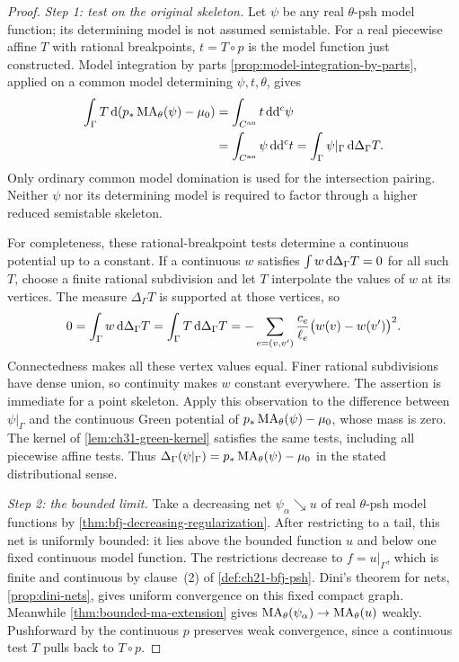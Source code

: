 \begin{proof}
\emph{Step 1: test on the original skeleton.}
Let \(\psi\) be any real \(\theta\)-psh model function; its determining
model is not assumed semistable.  For a real piecewise affine \(T\)
with rational breakpoints, \(t=T\circ p\) is the model function just
constructed.  Model integration by parts
\cref{prop:model-integration-by-parts}, applied on a common model
determining \(\psi,t,\theta\), gives
\begin{equation}
\label{eq:ch25-weighted-skeletal-test}
 \begin{aligned}
 \int_\Gamma T\,\mathrm d(p_*\operatorname{MA}_\theta(\psi)-\mu_0)
 &=\int_{C^{\mathrm{an}}}t\,\mathrm d\mathrm d^c\psi\\
 &=\int_{C^{\mathrm{an}}}\psi\,\mathrm d\mathrm d^c t
 =\int_\Gamma\psi|_\Gamma\,\mathrm d\Delta_\Gamma T.
 \end{aligned}
\end{equation}
Only ordinary common model domination is used for the intersection
pairing.  Neither \(\psi\) nor its determining model is required to
factor through a higher reduced semistable skeleton.

For completeness, these rational-breakpoint tests determine a
continuous potential up to a constant.  If a continuous \(w\) satisfies
\(\int w\,\mathrm d\Delta_\Gamma T=0\) for all such \(T\), choose a finite
rational subdivision and let \(T\) interpolate the values of \(w\) at
its vertices.  The measure \(\Delta_\Gamma T\) is supported at those
vertices, so
\[
 0=\int_\Gamma w\,\mathrm d\Delta_\Gamma T
   =\int_\Gamma T\,\mathrm d\Delta_\Gamma T
   =-\sum_{e=(v,v')}\frac{c_e}{\ell_e}
                         \bigl(w(v)-w(v')\bigr)^2.
\]
Connectedness makes all these vertex values equal.  Finer rational
subdivisions have dense union, so continuity makes \(w\) constant
everywhere.  The assertion is immediate for a point skeleton.
Apply this observation to the difference between \(\psi|_\Gamma\)
and the continuous Green potential of
\(p_*\operatorname{MA}_\theta(\psi)-\mu_0\), whose mass is zero.  The kernel of
\cref{lem:ch31-green-kernel} satisfies the same tests, including all
piecewise affine tests.  Thus
\(\Delta_\Gamma(\psi|_\Gamma)=p_*\operatorname{MA}_\theta(\psi)-\mu_0\) in the
stated distributional sense.

\emph{Step 2: the bounded limit.}
Take a decreasing net \(\psi_\alpha\searrow u\) of real
\(\theta\)-psh model functions by
\cref{thm:bfj-decreasing-regularization}.  After restricting to a
tail, this net is uniformly bounded: it lies above the bounded
function \(u\) and below one fixed continuous model function.
The restrictions decrease to \(f=u|_\Gamma\), which is finite and
continuous by clause~(2) of \cref{def:ch21-bfj-psh}.
Dini's theorem for nets, \cref{prop:dini-nets}, gives uniform
convergence on this fixed compact graph.  Meanwhile
\cref{thm:bounded-ma-extension} gives
\(\operatorname{MA}_\theta(\psi_\alpha)\to\operatorname{MA}_\theta(u)\) weakly.
Pushforward by the continuous \(p\) preserves weak convergence,
since a continuous test \(T\) pulls back to \(T\circ p\).


\end{proof}
